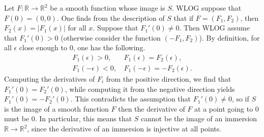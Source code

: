 \documentclass{amsart}
\numberwithin{equation}{section}
\theoremstyle{plain}
\theoremstyle{definition}
\theoremstyle{remark}
\renewcommand{\_}[2]{\underbrace{#1}_{#2}}
\renewcommand{\^}[2]{\overbrace{#1}_{#2}}
\newcommand{\R}{\mathbb{R}}
\begin{document}
Let $F: \R \to \R^2$ be a smooth function whose image is $S$. WLOG suppose that $F(0) = (0,0)$. One finds from the description of $S$ that if $F = (F_1, F_2)$, then $F_2(x) = |F_1(x)|$ for all $x$. Suppose that $F_1'(0) \neq 0$. Then WLOG assume that $F_1'(0) > 0$ (otherwise consider the function $(-F_1, F_2)$). By definition, for all $\epsilon$ close enough to $0$, one has the following.
\begin{align*}
  F_1(\epsilon)>0, &\, F_1(\epsilon) = F_2(\epsilon),\\
  F_1(-\epsilon)<0, &\, F_1(-\epsilon) = -F_2(\epsilon).
\end{align*}
Computing the derivatives of $F_i$ from the positive direction, we find that $F_1'(0) = F_2'(0)$, while computing it from the negative direction yields $F_1'(0) = -F_2'(0)$. This contradicts the assumption that $F_1'(0) \neq 0$, so if $S$ is the image of a smooth function $F$ then the derivative of $F$ at a point going to $0$ must be $0$. In particular, this means that $S$ cannot be the image of an immersion $\R \to \R^2$, since the derivative of an immersion is injective at all points.
\end{document}
